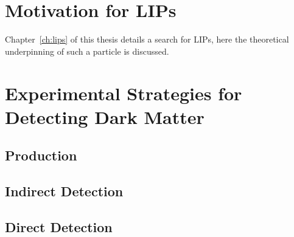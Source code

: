 \section{Motivation for LIPs}
Chapter~\ref{ch:lips} of this thesis details a search for \ac{LIP}s, here the theoretical underpinning of such a particle is discussed. 

\section{Experimental Strategies for Detecting Dark Matter}
\subsection{Production}

\subsection{Indirect Detection}

\subsection{Direct Detection}
